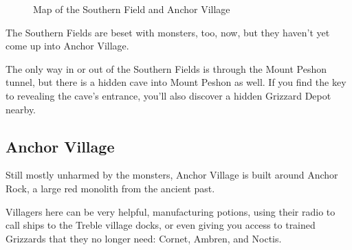 \documentclass[10pt,twocolumn]{memoir}
\begin{document}
\begin{figure}[ht]
  \begin{center}
  \end{center}
  \caption{Map of the Southern Field and Anchor Village}
\end{figure}

The Southern Fields are beset with monsters, too, now, but they haven't yet come
up into Anchor Village.

The  only  way  in  or  out  of   the  Southern  Fields  is  through  the  Mount
Peshon tunnel, but there is a hidden cave into Mount Peshon as well. If you find
the key to revealing the cave's entrance, you'll also discover a hidden Grizzard
Depot nearby.

\subsection{Anchor Village}

Still mostly  unharmed by the  monsters, Anchor  Village is built  around Anchor
Rock, a large red monolith from the ancient past.

Villagers here can be very helpful,  manufacturing potions, using their radio to
call ships  to the Treble  village docks, or even  giving you access  to trained
Grizzards that they no longer need: Cornet, Ambren, and Noctis.
\end{document}
